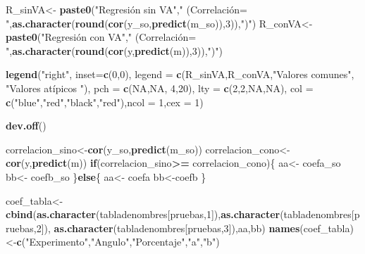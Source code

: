 \documentclass[]{article}
\newenvironment{Shaded}{\begin{snugshade}}{\end{snugshade}}
\newcommand{\KeywordTok}[1]{\textcolor[rgb]{0.13,0.29,0.53}{\textbf{#1}}}
\newcommand{\DataTypeTok}[1]{\textcolor[rgb]{0.13,0.29,0.53}{#1}}
\newcommand{\DecValTok}[1]{\textcolor[rgb]{0.00,0.00,0.81}{#1}}
\newcommand{\StringTok}[1]{\textcolor[rgb]{0.31,0.60,0.02}{#1}}
\newcommand{\OtherTok}[1]{\textcolor[rgb]{0.56,0.35,0.01}{#1}}
\newcommand{\ControlFlowTok}[1]{\textcolor[rgb]{0.13,0.29,0.53}{\textbf{#1}}}
\newcommand{\OperatorTok}[1]{\textcolor[rgb]{0.81,0.36,0.00}{\textbf{#1}}}
\newcommand{\NormalTok}[1]{#1}
\begin{document}
\begin{Shaded}
\begin{Highlighting}[]
{{{{{{{{{{{{\NormalTok{    R_sinVA<-}\StringTok{ }\KeywordTok{paste0}\NormalTok{(}\StringTok{"Regresión sin VA"}\NormalTok{,}\StringTok{" (Correlación= "}\NormalTok{,}\KeywordTok{as.character}\NormalTok{(}\KeywordTok{round}\NormalTok{(}\KeywordTok{cor}\NormalTok{(y_so,}\KeywordTok{predict}\NormalTok{(m_so)),}\DecValTok{3}\NormalTok{)),}\StringTok{")"}\NormalTok{)}
\NormalTok{    R_conVA<-}\StringTok{ }\KeywordTok{paste0}\NormalTok{(}\StringTok{"Regresión con VA"}\NormalTok{,}\StringTok{" (Correlación= "}\NormalTok{,}\KeywordTok{as.character}\NormalTok{(}\KeywordTok{round}\NormalTok{(}\KeywordTok{cor}\NormalTok{(y,}\KeywordTok{predict}\NormalTok{(m)),}\DecValTok{3}\NormalTok{)),}\StringTok{")"}\NormalTok{)}
    
    
    \KeywordTok{legend}\NormalTok{(}\StringTok{"right"}\NormalTok{, }\DataTypeTok{inset=}\KeywordTok{c}\NormalTok{(}\DecValTok{0}\NormalTok{,}\DecValTok{0}\NormalTok{),}
           \DataTypeTok{legend =} \KeywordTok{c}\NormalTok{(R_sinVA,R_conVA,}\StringTok{"Valores comunes"}\NormalTok{, }\StringTok{"Valores atípicos "}\NormalTok{),}
           \DataTypeTok{pch =} \KeywordTok{c}\NormalTok{(}\OtherTok{NA}\NormalTok{,}\OtherTok{NA}\NormalTok{, }\DecValTok{4}\NormalTok{,}\DecValTok{20}\NormalTok{),}
           \DataTypeTok{lty =} \KeywordTok{c}\NormalTok{(}\DecValTok{2}\NormalTok{,}\DecValTok{2}\NormalTok{,}\OtherTok{NA}\NormalTok{,}\OtherTok{NA}\NormalTok{), }
           \DataTypeTok{col =} \KeywordTok{c}\NormalTok{(}\StringTok{"blue"}\NormalTok{,}\StringTok{"red"}\NormalTok{,}\StringTok{"black"}\NormalTok{,}\StringTok{"red"}\NormalTok{),}\DataTypeTok{ncol =} \DecValTok{1}\NormalTok{,}\DataTypeTok{cex =} \DecValTok{1}\NormalTok{)}
    
    \KeywordTok{dev.off}\NormalTok{()}
    
\NormalTok{    correlacion_sino<-}\KeywordTok{cor}\NormalTok{(y_so,}\KeywordTok{predict}\NormalTok{(m_so))}
\NormalTok{    correlacion_cono<-}\KeywordTok{cor}\NormalTok{(y,}\KeywordTok{predict}\NormalTok{(m))}
    \ControlFlowTok{if}\NormalTok{(correlacion_sino}\OperatorTok{>=}\StringTok{ }\NormalTok{correlacion_cono)\{}
\NormalTok{      aa<-}\StringTok{ }\NormalTok{coefa_so}
\NormalTok{      bb<-}\StringTok{ }\NormalTok{coefb_so}
\NormalTok{    \}}\ControlFlowTok{else}\NormalTok{\{}
\NormalTok{      aa<-}\StringTok{ }\NormalTok{coefa}
\NormalTok{      bb<-coefb}
\NormalTok{    \}}
    
\NormalTok{    coef_tabla<-}\StringTok{ }\KeywordTok{cbind}\NormalTok{(}\KeywordTok{as.character}\NormalTok{(tabladenombres[pruebas,}\DecValTok{1}\NormalTok{]),}\KeywordTok{as.character}\NormalTok{(tabladenombres[pruebas,}\DecValTok{2}\NormalTok{]),}
                       \KeywordTok{as.character}\NormalTok{(tabladenombres[pruebas,}\DecValTok{3}\NormalTok{]),aa,bb)  }
    \KeywordTok{names}\NormalTok{(coef_tabla)<-}\KeywordTok{c}\NormalTok{(}\StringTok{"Experimento"}\NormalTok{,}\StringTok{"Angulo"}\NormalTok{,}\StringTok{"Porcentaje"}\NormalTok{,}\StringTok{"a"}\NormalTok{,}\StringTok{"b"}\NormalTok{)}
    
}}}}}}}}}}}}
\end{Highlighting}
\end{Shaded}
\end{document}
